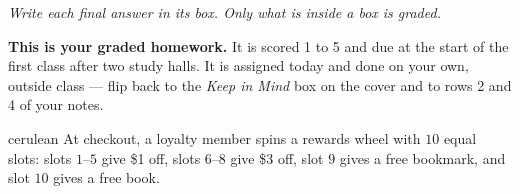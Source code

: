 \documentclass[12pt]{article}
\begin{document}
{\small\itshape Write each final answer in its box. Only what is inside a box is graded.}\par

\vspace{0.08in}

\begin{remindbox}
\small
\textbf{This is your graded homework.} It is scored 1 to 5 and due at the start of the first
class after two study halls. It is assigned today and done on your own, outside class --- flip
back to the \emph{Keep in Mind} box on the cover and to rows 2 and 4 of your notes.
\end{remindbox}

\vspace{0.06in}

\boxguard[12]
\begin{scenariobox}{cerulean}
At checkout, a loyalty member spins a rewards wheel with $10$ equal slots: slots $1$--$5$ give
\$1 off, slots $6$--$8$ give \$3 off, slot $9$ gives a free bookmark, and slot $10$ gives a free
book.
\end{scenariobox}

\vspace{0.06in}
\end{document}

